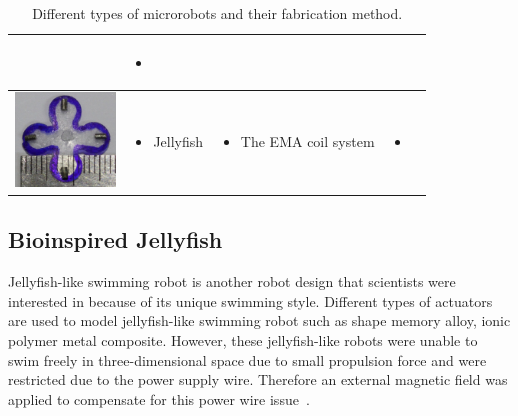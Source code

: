 \documentclass[a4paper,11pt]{article}
\begin{document}
\begin{sloppypar}
\begin{table}[h!]
\begin{tabular}{ c  m{3cm}  m{4.3cm} m{3cm} }
\begin{itemize}
      \end{itemize}
	&
	   \begin{itemize}
        \item \citep{gao2013bioinspired}
   
      \end{itemize}
    \\ \hline


 \begin{minipage}{.3\textwidth}
      \includegraphics[width=\linewidth, height=25mm]{Jelly}
    \end{minipage}
    &
      \begin{itemize}
        \item Jellyfish
     
      \end{itemize}
    & 
      \begin{itemize}
        \item The EMA coil system
     
      \end{itemize}
&
	   \begin{itemize}
        \item \citep{ko2012jellyfish}
   
      \end{itemize}
    \\ \hline



  \end{tabular}
  \caption{Different types of microrobots and their fabrication method.}\label{Micro}
\end{table}



\subsection{Bioinspired Jellyfish}
Jellyfish-like swimming robot is another robot design that scientists were interested 
in because of its unique swimming style. Different types of actuators are used to model
 jellyfish-like swimming robot such as shape memory alloy, ionic polymer metal 
composite. However, these jellyfish-like robots were unable to swim freely in 
three-dimensional space due to small propulsion force and were restricted due to
 the power supply wire. Therefore an external magnetic field was applied to compensate 
for this power wire issue~\citep{ko2012jellyfish}.


\end{sloppypar}
\end{document}
